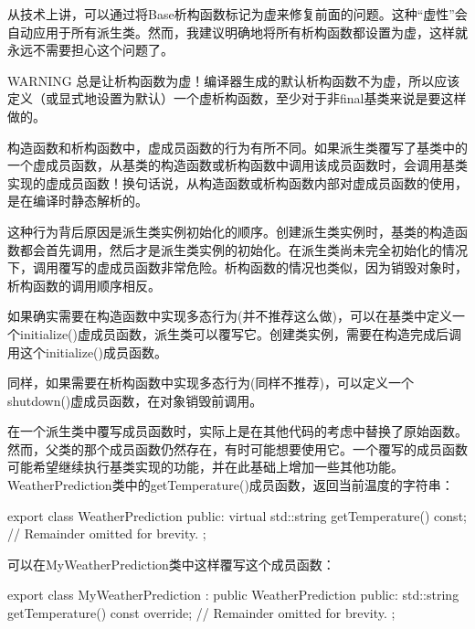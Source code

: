 从技术上讲，可以通过将Base析构函数标记为虚来修复前面的问题。这种“虚性”会自动应用于所有派生类。然而，我建议明确地将所有析构函数都设置为虚，这样就永远不需要担心这个问题了。

\begin{myWarning}{WARNING}
总是让析构函数为虚！编译器生成的默认析构函数不为虚，所以应该定义（或显式地设置为默认）一个虚析构函数，至少对于非final基类来说是要这样做的。
\end{myWarning}


构造函数和析构函数中，虚成员函数的行为有所不同。如果派生类覆写了基类中的一个虚成员函数，从基类的构造函数或析构函数中调用该成员函数时，会调用基类实现的虚成员函数！换句话说，从构造函数或析构函数内部对虚成员函数的使用，是在编译时静态解析的。

这种行为背后原因是派生类实例初始化的顺序。创建派生类实例时，基类的构造函数都会首先调用，然后才是派生类实例的初始化。在派生类尚未完全初始化的情况下，调用覆写的虚成员函数非常危险。析构函数的情况也类似，因为销毁对象时，析构函数的调用顺序相反。

如果确实需要在构造函数中实现多态行为(并不推荐这么做)，可以在基类中定义一个initialize()虚成员函数，派生类可以覆写它。创建类实例，需要在构造完成后调用这个initialize()成员函数。

同样，如果需要在析构函数中实现多态行为(同样不推荐)，可以定义一个shutdown()虚成员函数，在对象销毁前调用。


在一个派生类中覆写成员函数时，实际上是在其他代码的考虑中替换了原始函数。然而，父类的那个成员函数仍然存在，有时可能想要使用它。一个覆写的成员函数可能希望继续执行基类实现的功能，并在此基础上增加一些其他功能。WeatherPrediction类中的getTemperature()成员函数，返回当前温度的字符串：

\begin{cpp}
export class WeatherPrediction
{
    public:
        virtual std::string getTemperature() const;
        // Remainder omitted for brevity.
};
\end{cpp}

可以在MyWeatherPrediction类中这样覆写这个成员函数：

\begin{cpp}
export class MyWeatherPrediction : public WeatherPrediction
{
    public:
        std::string getTemperature() const override;
        // Remainder omitted for brevity.
};
\end{cpp}

